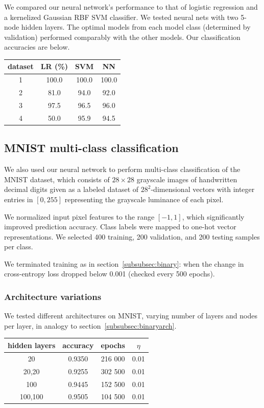 \documentclass{article}
\begin{document}
\begin{multicols}{2}
We compared our neural network's performance to that of 
logistic regression and a kernelized Gaussian RBF SVM classifier.
We tested neural nets with two 5-node hidden layers.
The optimal models from each model class (determined by validation)
performed comparably with the other models.
Our classification accuracies are below.

\begin{center}
    \begin{tabular}{c|c|c|c}
        dataset & LR (\%) & SVM & NN  \\\hline
        1	&100.0& 100.0 & 100.0\\
        2	&81.0 & 94.0 & 92.0 \\
        3	&97.5 & 96.5 & 96.0 \\
        4	&50.0 & 95.9 & 94.5
    \end{tabular}
\end{center}

\subsection{MNIST multi-class classification}

We also used our neural network
to perform multi-class classification of the MNIST dataset,
which consists of $28\times 28$ grayscale images
of handwritten decimal digits
given as a labeled dataset of $28^2$-dimensional vectors
with integer entries in $[0,255]$
representing the grayscale luminance of each pixel.

We normalized input pixel features to the range $[-1, 1]$,
which significantly improved prediction accuracy.
Class labels were mapped to one-hot vector representations.
We selected 400 training, 200 validation, and 200 testing samples per class.

We terminated training as in section~\ref{subsubsec:binary}:
when the change in cross-entropy loss dropped below 0.001
(checked every 500 epochs).

\subsubsection{Architecture variations}

We tested different architectures on MNIST,
varying number of layers and nodes per layer,
in analogy to section~\ref{subsubsec:binaryarch}.

\begin{center}
    \begin{tabular}{c|c|c|c}
        hidden layers & accuracy	& epochs & $\eta$ \\\hline
        20		& 0.9350 	& 216 000 	& 0.01\\
        20,20	& 0.9255 	& 302 500 	& 0.01\\
        100		& 0.9445 	& 152 500 	& 0.01 \\
        100,100	& 0.9505 	& 104 500 	& 0.01
    \end{tabular}
\end{center}


\end{multicols}
\end{document}

